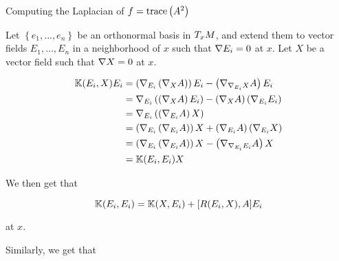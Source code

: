 \begin{frame}[allowframebreaks]{Computing the Laplacian of \(f=\trace{A^{2}}\)}
  \framebreak

  Let \(\left\{e_{1},\ldots,e_{n}\right\}\) be an orthonormal basis in
  \(\tangentspace{M}{x}\), and extend them to vector fields
  \(E_{1},\ldots,E_{n}\) in a neighborhood of \(x\) such that
  \(\immersionconn{E_{i}}=0\) at \(x\). Let \(X\) be a vector field such that
  \(\immersionconn{X}=0\) at \(x\).

  \framebreak

  \begin{align*}
    \ShapeOperatorsSecondCovariantDerivative(E_{i},X)E_{i} & =\left(\immersionconn_{E_{i}}\left(\immersionconn_{X}A\right)\right)E_{i}-\left(\immersionconn_{\immersionconn_{E_{i}}X}A\right)E_{i}              \\
                                                           & =\immersionconn_{E_{i}}\left(\left(\immersionconn_{X}A\right)E_{i}\right)-\left(\immersionconn_{X}A\right)\left(\immersionconn_{E_{i}}E_{i}\right) \\
                                                           & =\immersionconn_{E_{i}}\left(\left(\immersionconn_{E_{i}}A\right)X\right)                                                                          \\
                                                           & =\left(\immersionconn_{E_{i}}\left(\immersionconn_{E_{i}}A\right)\right)X+\left(\immersionconn_{E_{i}}A\right)\left(\immersionconn_{E_{i}}X\right) \\
                                                           & =\left(\immersionconn_{E_{i}}\left(\immersionconn_{E_{i}}A\right)\right)X-\left(\immersionconn_{\immersionconn_{E_{i}}E_{i}}A\right)X              \\
                                                           & =\ShapeOperatorsSecondCovariantDerivative(E_{i},E_{i})X
  \end{align*}

  \framebreak

  We then get that

  \begin{equation}\label{eq:shape-operators-second-convariant-derivative-at-ei-ei}
    \ShapeOperatorsSecondCovariantDerivative(E_{i},E_{i})=\ShapeOperatorsSecondCovariantDerivative(X,E_{i})+[R(E_{i},X),A]E_{i}
  \end{equation}

  at \(x\).

  \framebreak

  Similarly, we get that


\end{frame}
